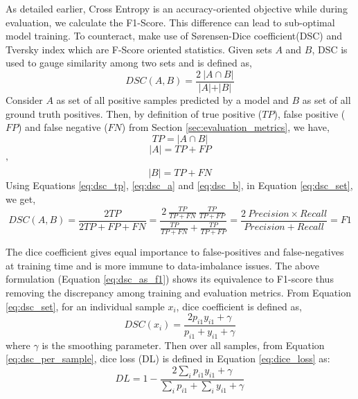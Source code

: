 As detailed earlier, Cross Entropy is an accuracy-oriented objective while during evaluation, we calculate the F1-Score. This difference can lead to sub-optimal model training. To counteract, \cite{li2019dice} make use of S{\o}rensen-Dice coefficient(DSC)\cite{sorensen1948method, dice1945measures} and Tversky index\cite{tversky1977features} which are F-Score oriented statistics. Given sets $A$ and $B$, DSC is used to gauge similarity among two sets and is defined as,
\begin{equation}
\label{eq:dsc_set}
    DSC(A, B) = \frac{2\ \vert A \cap B \vert}{\vert A \vert + \vert B \vert}
\end{equation}
Consider $A$ as set of all positive samples predicted by a model and $B$ as set of all ground truth positives. Then, by definition of true positive ($TP$), false positive ($FP$) and false negative ($FN$) from Section \ref{sec:evaluation_metrics}, we have,
\begin{equation}
\label{eq:dsc_tp}
    TP = \vert A \cap B \vert
\end{equation}
\begin{equation}
\label{eq:dsc_a}
    \vert A \vert = TP + FP
\end{equation}'
\begin{equation}
\label{eq:dsc_b}
    \vert B \vert = TP + FN
\end{equation}
Using Equations \ref{eq:dsc_tp}, \ref{eq:dsc_a} and \ref{eq:dsc_b}, in Equation \ref{eq:dsc_set}, we get,
\begin{equation}
\label{eq:dsc_as_f1}
     DSC(A, B) = \frac{2TP}{2TP + FP + FN} = \frac{2\ \frac{TP}{TP + FN}\ \frac{TP}{TP + FP}}{\frac{TP}{TP + FN} + \frac{TP}{TP + FP}} = \frac{2\ Precision \times Recall}{Precision + Recall} = F1
\end{equation}

The dice coefficient gives equal importance to false-positives and false-negatives at training time and is more immune to data-imbalance issues\cite{sudre2017generalised, shen2018influence, kodym2018segmentation}. The above formulation (Equation \ref{eq:dsc_as_f1}) shows its equivalence to F1-score thus removing the discrepancy among training and evaluation metrics. From Equation \ref{eq:dsc_set}, for an individual sample $x_i$, dice coefficient is defined as,
\begin{equation}
\label{eq:dsc_per_sample}
    DSC(x_i) = \frac{2p_{i1}y_{i1} + \gamma}{p_{i1} + y_{i1} + \gamma}
\end{equation}
where $\gamma$ is the smoothing parameter. Then over all samples, from Equation \ref{eq:dsc_per_sample}, dice loss (DL) is defined in Equation \ref{eq:dice_loss} as:
\begin{equation}
\label{eq:dice_loss}
    DL = 1 - \frac{2\sum_i{p_{i1}y_{i1}} + \gamma}{\sum_i{p_{i1}} + \sum_i{y_{i1}} + \gamma}
\end{equation}
